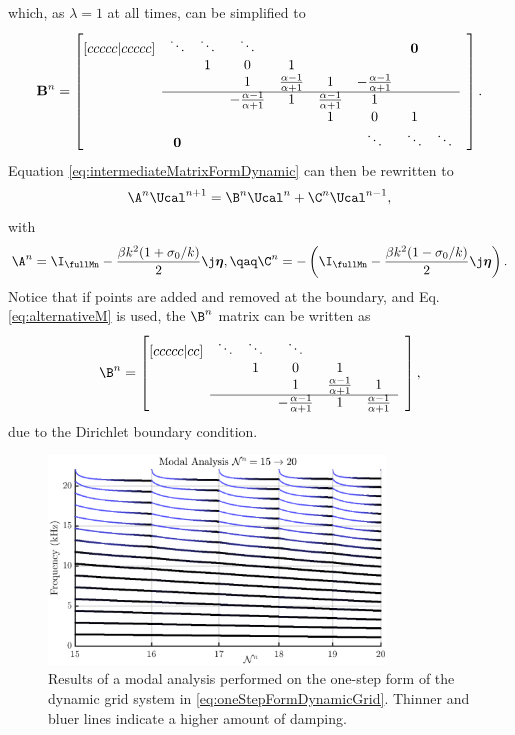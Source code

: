 which, as $\lambda = 1$ at all times, can be simplified to
\begin{equation}\label{eq:quadMat}
    \mathbf{B}^n = \begin{bmatrix}[ccccc|ccccc]
        & \ddots& \ddots  &\ddots & & & & \mathbf{0} & & \\
        & & 1 & 0 & 1 & & & & & \\
        & & & 1 & \frac{\alpha - 1}{\alpha + 1}& 1 & -\frac{\alpha - 1}{\alpha + 1} & & \\ \cline{2-9}
        & & & -\frac{\alpha - 1}{\alpha + 1} & 1 & \frac{\alpha - 1}{\alpha + 1} & 1 & & & \\
        & & & & &1 & 0 & 1 & & \\
        & \mathbf{0} & & & &  &\ddots & \ddots &\ddots &
    \end{bmatrix}.
\end{equation}
Equation \eqref{eq:intermediateMatrixFormDynamic} can then be rewritten to 
\begin{equation}\label{eq:dynamicMatrixForm}
    \A^n \Ucal^{n+1} = \B^n \Ucal^n + \C^n\Ucal^{n-1},
\end{equation}
with
\begin{equation*}
    \A^n = \I_\fullMn - \frac{\beta k^2 (1+\sigma_0/k)}{2}\j\boldsymbol{\eta},\qaq \C^n = -\left(\I_\fullMn - \frac{\beta k^2 (1-\sigma_0/k)}{2}\j\boldsymbol{\eta}\right).
\end{equation*}
Notice that if points are added and removed at the boundary, and Eq. \eqref{eq:alternativeM} is used, the $\B^n$ matrix can be written as
\begin{equation}
    \B^n = \begin{bmatrix}[ccccc|cc]
        & \ddots& \ddots  &\ddots & & & \\
        & & 1 & 0 & 1 & & \\
        & & & 1 & \frac{\alpha - 1}{\alpha + 1}& 1 & \\ \cline{2-6}
        & & & -\frac{\alpha - 1}{\alpha + 1} & 1 & \frac{\alpha - 1}{\alpha + 1} &
    \end{bmatrix},
\end{equation}
due to the Dirichlet boundary condition.
\begin{figure}[h]
    \centering
    \includegraphics[width=0.8\textwidth]{figures/contributions/dynamicgrid/modalAnalysisOneStep.eps}\caption{Results of a modal analysis performed on the one-step form of the dynamic grid system in \eqref{eq:oneStepFormDynamicGrid}. Thinner and bluer lines indicate a higher amount of damping.\label{fig:modalAnalysisOneStep}}
\end{figure}

